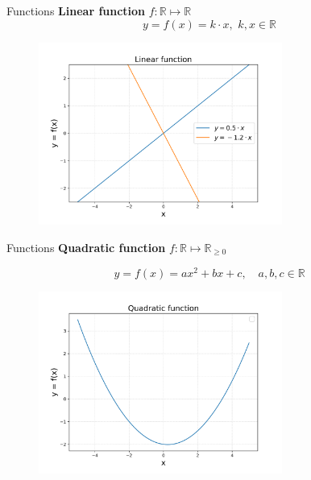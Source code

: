 \documentclass[aspectratio=169]{beamer}
\begin{document}
\begin{frame}[t]{Functions}
    \textbf{Linear function} $f: \mathbb{R} \mapsto \mathbb{R}$
    $$ y = f(x) = k \cdot x, \,\, k, x \in \mathbb{R} $$
    
    \begin{figure}[h]
        \centering
        \includegraphics[width=8cm]{../../analysis/output/mathprelim/linfunc.png}
    \end{figure}
\end{frame}

\begin{frame}[t]{Functions}
    \textbf{Quadratic function} $f: \mathbb{R} \mapsto \mathbb{R}_{\geq 0}$

    $$ y = f(x) = ax^2 + bx + c, \quad a, b, c \in \mathbb{R} $$
    
    \begin{figure}[h]
        \centering
        \includegraphics[width=8cm]{../../analysis/output/mathprelim/quadfunc.png}
    \end{figure}
\end{frame}
\end{document}
